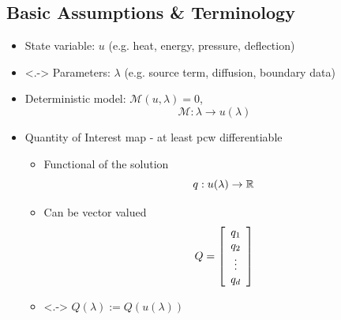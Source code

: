 \subsection{Basic Assumptions \& Terminology}
\begin{frame}[t]

\begin{itemize}
	\item State variable: $u$ {\color{gray}(e.g. heat, energy, pressure, deflection)}
	\vskip 10pt
	\item<.-> Parameters: $\lambda$ {\color{gray}(e.g. source term, diffusion, boundary data)}
	\vskip 10pt
		\item Deterministic model: $\mathcal{M} (u, \lambda) = 0$, $$\mathcal{M}:\lambda \to u(\lambda)$$

	\item Quantity of Interest map  - at least pcw differentiable \vskip 5pt
		\begin{itemize}
		\item Functional of the solution $$q: u(\lambda) \to \RR$$
		\item Can be vector valued $$Q = \mat{c}{q_1\\ q_2\\ \vdots \\ q_d}$$
		\item<.-> $Q(\lambda) := Q(u(\lambda))$
	\end{itemize}

\end{itemize}

\end{frame}



